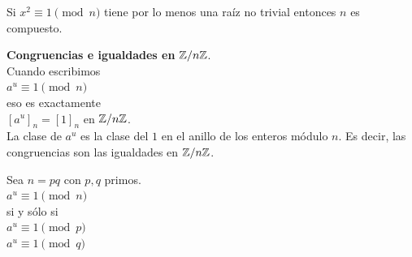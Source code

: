 \begin{enunciado} \label{enun:criterioRabin}\leavevmode\par
Si $x^2 \equiv 1 \pmod n$ tiene por lo menos una raíz no trivial entonces $n$ es compuesto.
\end{enunciado}

\textbf{Congruencias e igualdades en} $\mathbb{Z}/n\mathbb{Z}$. \\ 
Cuando escribimos \\
$a^u \equiv 1 \pmod n$ \\
eso es exactamente \\
$[a^u]_n = [1]_n$ en $\mathbb{Z}/n\mathbb{Z}$.  \\
La clase de $a^u$ es la clase del $1$ en el anillo de los enteros módulo $n$. Es decir, las congruencias son las igualdades en $\mathbb{Z}/n\mathbb{Z}$. 

\begin{enunciado} [Desdoblamiento]\label{enun:desdoblar}\leavevmode\par 
Sea $n=pq$ con $p,q$ primos. \\
$a^u \equiv 1 \pmod n$ \\
si y sólo si \\
$a^u \equiv 1 \pmod p$ \\
$a^u \equiv 1 \pmod q$
\end{enunciado}

